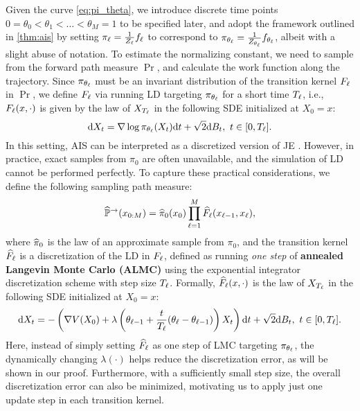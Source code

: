 Given the curve \cref{eq:pi_theta}, we introduce discrete time points $0=\theta_0<\theta_1<...<\theta_M=1$ to be specified later, and adopt the framework outlined in \cref{thm:ais} by setting $\pi_\ell=\frac{1}{Z_\ell}f_\ell$ to correspond to $\pi_{\theta_\ell}=\frac{1}{Z_{\theta_\ell}}f_{\theta_\ell}$, albeit with a slight abuse of notation. To estimate the normalizing constant, we need to sample from the forward path measure $\Pr$, and calculate the work function along the trajectory. Since $\pi_{\theta_\ell}$ must be an invariant distribution of the transition kernel $F_\ell$ in $\Pr$, we define $F_\ell$ via running LD targeting $\pi_{\theta_\ell}$ for a short time $T_\ell$, i.e., $F_\ell(x,\cdot)$ is given by the law of $X_{T_\ell}$ in the following SDE initialized at $X_0=x$:
\begin{equation}
    \mathrm{d} X_t=\nabla\log\pi_{\theta_\ell}(X_t)\mathrm{d} t+\sqrt{2}\mathrm{d} B_t,~t\in[0,T_\ell].
    \label{eq:ais_ker_f}
\end{equation}
In this setting, AIS can be interpreted as a discretized version of JE \cite[Remark 4.5]{lelievre2010free}. However, in practice, exact samples from $\pi_0$ are often unavailable, and the simulation of LD cannot be performed perfectly. To capture these practical considerations, we define the following sampling path measure:
\begin{equation}
    \widehat{\mathbb{P}}^\to(x_{0:M})=\widehat{\pi}_0(x_0)\prod_{\ell=1}^{M}\widehat{F}_\ell(x_{\ell-1},x_\ell),
    \label{eq:ais_phr}
\end{equation}
where $\widehat{\pi}_0$ is the law of an approximate sample from $\pi_0$, and the transition kernel $\widehat{F}_\ell$ is a discretization of the LD in $F_\ell$, defined as running \emph{one step} of \textbf{annealed Langevin Monte Carlo (ALMC)} using the exponential integrator discretization scheme \citep{zhang2023fast,zhang2023gddim,zhang2023improved} with step size $T_\ell$. Formally, $\widehat{F}_\ell(x,\cdot)$ is the law of $X_{T_\ell}$ in the following SDE initialized at $X_0=x$:
\begin{equation}
    \mathrm{d} X_t=-\left(\nabla V(X_0)+\lambda\left(\theta_{\ell-1}+\frac{t}{T_\ell}(\theta_\ell-\theta_{\ell-1})\right)X_t\right)\mathrm{d} t+\sqrt{2}\mathrm{d} B_t,~t\in[0,T_\ell].
    \label{eq:ais_ker_fh}
\end{equation}
Here, instead of simply setting $\widehat{F}_\ell$ as one step of LMC targeting $\pi_{\theta_\ell}$, the dynamically changing $\lambda(\cdot)$ helps reduce the discretization error, as will be shown in our proof. Furthermore, with a sufficiently small step size, the overall discretization error can also be minimized, motivating us to apply just one update step in each transition kernel.

